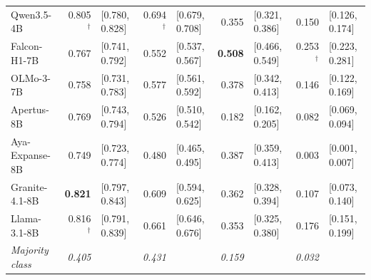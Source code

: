 \begin{table}[t]
{\begin{tabular}{lrlrlrlrl}
Qwen3.5-4B & 0.805$^{\dagger}$ & {\footnotesize[0.780, 0.828]} & 0.694$^{\dagger}$ & {\footnotesize[0.679, 0.708]} & 0.355 & {\footnotesize[0.321, 0.386]} & 0.150 & {\footnotesize[0.126, 0.174]} \\
Falcon-H1-7B & 0.767 & {\footnotesize[0.741, 0.792]} & 0.552 & {\footnotesize[0.537, 0.567]} & \textbf{0.508} & {\footnotesize[0.466, 0.549]} & 0.253$^{\dagger}$ & {\footnotesize[0.223, 0.281]} \\
OLMo-3-7B & 0.758 & {\footnotesize[0.731, 0.783]} & 0.577 & {\footnotesize[0.561, 0.592]} & 0.378 & {\footnotesize[0.342, 0.413]} & 0.146 & {\footnotesize[0.122, 0.169]} \\
Apertus-8B & 0.769 & {\footnotesize[0.743, 0.794]} & 0.526 & {\footnotesize[0.510, 0.542]} & 0.182 & {\footnotesize[0.162, 0.205]} & 0.082 & {\footnotesize[0.069, 0.094]} \\
Aya-Expanse-8B & 0.749 & {\footnotesize[0.723, 0.774]} & 0.480 & {\footnotesize[0.465, 0.495]} & 0.387 & {\footnotesize[0.359, 0.413]} & 0.003 & {\footnotesize[0.001, 0.007]} \\
Granite-4.1-8B & \textbf{0.821} & {\footnotesize[0.797, 0.843]} & 0.609 & {\footnotesize[0.594, 0.625]} & 0.362 & {\footnotesize[0.328, 0.394]} & 0.107 & {\footnotesize[0.073, 0.140]} \\
Llama-3.1-8B & 0.816$^{\dagger}$ & {\footnotesize[0.791, 0.839]} & 0.661 & {\footnotesize[0.646, 0.676]} & 0.353 & {\footnotesize[0.325, 0.380]} & 0.176 & {\footnotesize[0.151, 0.199]} \\
\midrule
\textit{Majority class} & \textit{0.405} &  & \textit{0.431} &  & \textit{0.159} &  & \textit{0.032} &  \\
\bottomrule
\end{tabular}}
\end{table}
